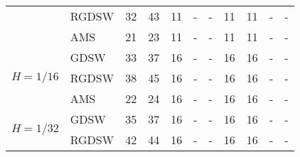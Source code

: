 \begin{table}[H]
\begin{tabular}{llrrrllrrll}
\cline{2-11}
\bfseries  & RGDSW & 32 & {\cellcolor[HTML]{405FE5}} \color[HTML]{F1F1F1} 43 & 11 & {\cellcolor[HTML]{ACB8F4}} \color[HTML]{000000} {\cellcolor[HTML]{E2E4FB}} - & - & {\cellcolor[HTML]{768BEC}} \color[HTML]{F1F1F1} 11 & 11 & {\cellcolor[HTML]{E2E4FB}} \color[HTML]{000000} {\cellcolor[HTML]{E2E4FB}} - & - \\
\cline{2-11}
\bfseries  & AMS & 21 & {\cellcolor[HTML]{405FE5}} \color[HTML]{F1F1F1} 23 & 11 & {\cellcolor[HTML]{ACB8F4}} \color[HTML]{000000} {\cellcolor[HTML]{E2E4FB}} - & - & {\cellcolor[HTML]{768BEC}} \color[HTML]{F1F1F1} 11 & 11 & {\cellcolor[HTML]{E2E4FB}} \color[HTML]{000000} {\cellcolor[HTML]{E2E4FB}} - & - \\
\cline{1-11} \cline{2-11}
\multirow[c]{3}{*}{\bfseries $H=1/16$} & GDSW & 33 & {\cellcolor[HTML]{405FE5}} \color[HTML]{F1F1F1} 37 & 16 & {\cellcolor[HTML]{ACB8F4}} \color[HTML]{000000} {\cellcolor[HTML]{E2E4FB}} - & - & {\cellcolor[HTML]{768BEC}} \color[HTML]{F1F1F1} 16 & 16 & {\cellcolor[HTML]{E2E4FB}} \color[HTML]{000000} {\cellcolor[HTML]{E2E4FB}} - & - \\
\cline{2-11}
\bfseries  & RGDSW & 38 & {\cellcolor[HTML]{405FE5}} \color[HTML]{F1F1F1} 45 & 16 & {\cellcolor[HTML]{ACB8F4}} \color[HTML]{000000} {\cellcolor[HTML]{E2E4FB}} - & - & {\cellcolor[HTML]{768BEC}} \color[HTML]{F1F1F1} 16 & 16 & {\cellcolor[HTML]{E2E4FB}} \color[HTML]{000000} {\cellcolor[HTML]{E2E4FB}} - & - \\
\cline{2-11}
\bfseries  & AMS & 22 & {\cellcolor[HTML]{405FE5}} \color[HTML]{F1F1F1} 24 & 16 & {\cellcolor[HTML]{ACB8F4}} \color[HTML]{000000} {\cellcolor[HTML]{E2E4FB}} - & - & {\cellcolor[HTML]{768BEC}} \color[HTML]{F1F1F1} 16 & 16 & {\cellcolor[HTML]{E2E4FB}} \color[HTML]{000000} {\cellcolor[HTML]{E2E4FB}} - & - \\
\cline{1-11} \cline{2-11}
\multirow[c]{3}{*}{\bfseries $H=1/32$} & GDSW & 35 & {\cellcolor[HTML]{405FE5}} \color[HTML]{F1F1F1} 37 & 16 & {\cellcolor[HTML]{ACB8F4}} \color[HTML]{000000} {\cellcolor[HTML]{E2E4FB}} - & - & {\cellcolor[HTML]{768BEC}} \color[HTML]{F1F1F1} 16 & 16 & {\cellcolor[HTML]{E2E4FB}} \color[HTML]{000000} {\cellcolor[HTML]{E2E4FB}} - & - \\
\cline{2-11}
\bfseries  & RGDSW & 42 & {\cellcolor[HTML]{405FE5}} \color[HTML]{F1F1F1} 44 & 16 & {\cellcolor[HTML]{ACB8F4}} \color[HTML]{000000} {\cellcolor[HTML]{E2E4FB}} - & - & {\cellcolor[HTML]{768BEC}} \color[HTML]{F1F1F1} 16 & 16 & {\cellcolor[HTML]{E2E4FB}} \color[HTML]{000000} {\cellcolor[HTML]{E2E4FB}} - & - \\

\end{tabular}
\end{table}
